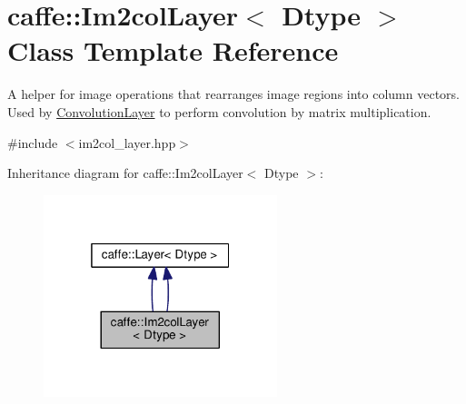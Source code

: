 \hypertarget{classcaffe_1_1_im2col_layer}{}\section{caffe\+:\+:Im2col\+Layer$<$ Dtype $>$ Class Template Reference}
\label{classcaffe_1_1_im2col_layer}


A helper for image operations that rearranges image regions into column vectors. Used by \mbox{\hyperlink{classcaffe_1_1_convolution_layer}{Convolution\+Layer}} to perform convolution by matrix multiplication.  




{\ttfamily \#include $<$im2col\+\_\+layer.\+hpp$>$}



Inheritance diagram for caffe\+:\+:Im2col\+Layer$<$ Dtype $>$\+:
\nopagebreak
\begin{figure}[H]
\begin{center}
\leavevmode
\includegraphics[width=193pt]{classcaffe_1_1_im2col_layer__inherit__graph}
\end{center}
\end{figure}
